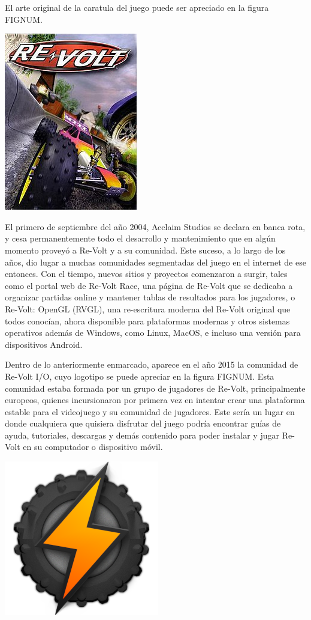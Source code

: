 El arte original de la caratula del juego puede ser apreciado en la figura FIGNUM.

\includegraphics{img/re-volt.jpg}

El primero de septiembre del año 2004, Acclaim Studios se declara en banca rota, y cesa permanentemente todo el desarrollo y mantenimiento que en algún momento proveyó a Re-Volt y a su comunidad. Este suceso, a lo largo de los años, dio lugar a muchas comunidades segmentadas del juego en el internet de ese entonces. Con el tiempo, nuevos sitios y proyectos comenzaron a surgir, tales como el portal web de Re-Volt Race, una página de Re-Volt que se dedicaba a organizar partidas online y mantener tablas de resultados para los jugadores, o Re-Volt: OpenGL (RVGL), una re-escritura moderna del Re-Volt original que todos conocían, ahora disponible para plataformas modernas y otros sistemas operativos además de Windows, como Linux, MacOS, e incluso una versión para dispositivos Android.

Dentro de lo anteriormente enmarcado, aparece en el año 2015 la comunidad de Re-Volt I/O, cuyo logotipo se puede apreciar en la figura FIGNUM. Esta comunidad estaba formada por un grupo de jugadores de Re-Volt, principalmente europeos, quienes incursionaron por primera vez en intentar crear una plataforma estable para el videojuego y su comunidad de jugadores. Este sería un lugar en donde cualquiera que quisiera disfrutar del juego podría encontrar guías de ayuda, tutoriales, descargas y demás contenido para poder instalar y jugar Re-Volt en su computador o dispositivo móvil.

\includegraphics{img/io.png}

